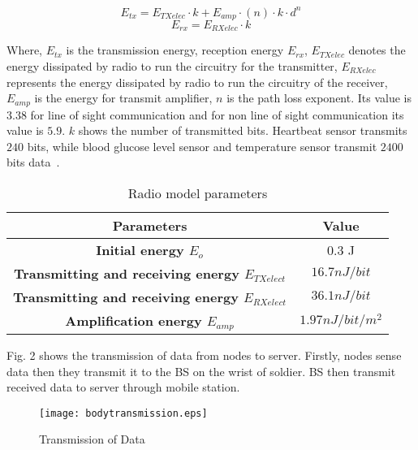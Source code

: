 \documentclass[journal]{IEEEtran}
\begin{document}
\begin{equation}
   E_{tx}=E_{TXelec}\cdot k + E_{amp}\cdot(n)\cdot k \cdot d ^n
\end{equation}
\begin{equation}
   E_{rx}=E_{RXelec}\cdot k
\end{equation}

Where, $E_{tx}$ is the transmission energy, reception energy $E_{rx}$, $E_{TXelec}$ denotes the energy dissipated by radio to run the circuitry for the
transmitter, $E_{RXelec}$ represents the energy dissipated by radio to run the circuitry of the receiver, $E_{amp}$ is the energy for transmit amplifier,
$n$ is the path loss exponent. Its value is $3.38$ for line of sight communication and for non line of sight communication its value is $5.9$. $k$ shows the
 number of transmitted bits. Heartbeat sensor transmits $240$ bits, while blood glucose level sensor and temperature sensor transmit $2400$ bits data~\cite{15}.

 \begin{table}[!ht]
\begin{center}
\caption{Radio model parameters}
  \begin{tabular}{|c|c|}\hline
   \textbf{Parameters}                                           & \textbf{Value}            \\ \hline \hline
    \textbf{Initial energy $E_{o}$ }                             &  0.3 J                     \\ \hline
\textbf{Transmitting and receiving energy $E_{TXelect}$}       &  $ 16.7nJ/bit       $         \\ \hline
      \textbf{Transmitting and receiving energy $E_{RXelect}$}   &  $ 36.1nJ/bit       $          \\ \hline
      \textbf{Amplification energy $E_{amp}$}                    &  $1.97 nJ/bit/m^2$              \\ \hline
\end{tabular}
\end{center}
\end{table}

Fig. 2 shows the transmission of data from nodes to server. Firstly, nodes sense data then they transmit it to the BS on the wrist of soldier. BS then transmit
 received data to server through mobile station.

\begin{figure*} [t]
\centering
\texttt{[image: bodytransmission.eps]}
\caption{Transmission of Data}
\end{figure*}
\end{document}
